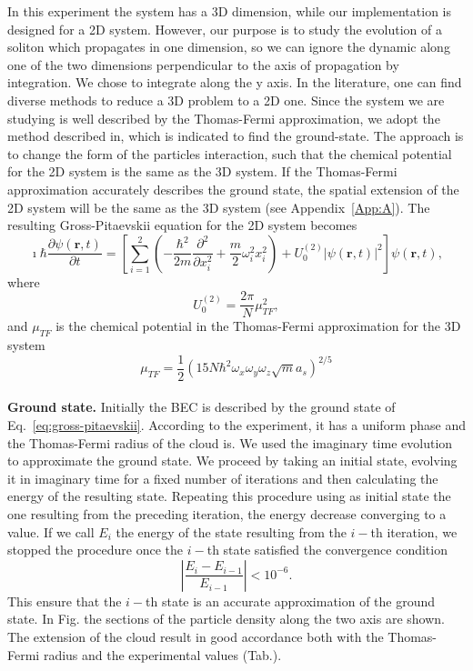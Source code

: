 In this experiment the system has a 3D dimension, while our implementation is designed for a 2D system. However, our purpose is to study the evolution of a soliton which propagates in one dimension, so we can ignore the dynamic along one of the two dimensions perpendicular to the axis of propagation by integration. We chose to integrate along the y axis. In the literature, one can find diverse methods to reduce a 3D problem to a 2D one.
 Since the system we are studying is well described by the Thomas-Fermi approximation, we adopt the method described in, which is indicated to find the ground-state.
The approach is to change the form of the particles interaction, such that the chemical potential for the 2D system is the same as the 3D system. If the Thomas-Fermi approximation accurately describes the ground state, the spatial extension of the 2D system will be the same as the 3D system (see Appendix~\ref{App:A}). 
The resulting Gross-Pitaevskii equation for the 2D system becomes
\begin{equation}
\imath \hbar \frac{\partial \psi(\textbf{r}, t)}{\partial t} = \left[ \sum_{i=1}^2 \left( -\frac{\hbar^2}{2m} \frac{\partial^2}{\partial x_i^2} + \frac{m}{2} \omega_i^2 x_i^2 \right) + U_0^{(2)} |\psi(\textbf{r}, t)|^2 \right] \psi(\textbf{r}, t),
\end{equation}
where
\begin{equation}
U_0^{(2)} = \frac{2\pi}{N} \mu_{TF}^2 ,
\end{equation}
and $\mu_{TF}$ is the chemical potential in the Thomas-Fermi approximation for the 3D system
\begin{equation}
\mu_{TF} = \frac{1}{2} \left( 15 N \hbar^2 \omega_x \omega_y \omega_z \sqrt{m} a_s \right)^{2/5}
\end{equation}
\\
\noindent \textbf{Ground state.} Initially the BEC is described by the ground state  of Eq.~\eqref{eq:gross-pitaevskii}. According to the experiment, it has a uniform phase and the Thomas-Fermi radius of the cloud is. %
We used the imaginary time evolution to approximate the ground state. We proceed by taking an initial state, evolving it in imaginary time for a fixed number of iterations and then calculating the energy of the resulting state. Repeating this procedure using as initial state the one resulting from the preceding iteration, the energy decrease converging to a value. If we call $E_i$ the energy of the state resulting from the $i-$th iteration, we stopped the procedure once the $i-$th state satisfied the convergence condition
\begin{equation}
\left| \frac{E_{i} - E_{i-1}}{E_{i-1}} \right| < 10^{-6}.
\end{equation}
This ensure that the $i-$th state is an accurate approximation of the ground state. In Fig. %
the sections of the particle density along the two axis are shown. The extension of the cloud result in good accordance both with the Thomas-Fermi radius and the experimental values (Tab.). %


